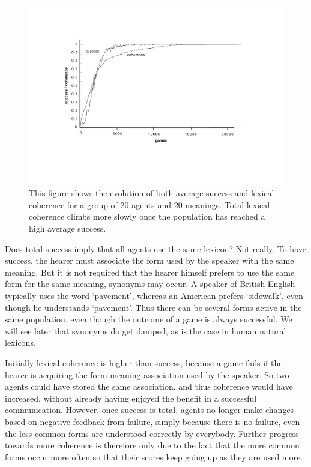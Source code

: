 \begin{figure}[htbp]
  \centerline{\includegraphics[width=\textwidth]{chap5/figs/suc-coh.pdf}}
\caption{\label{suc-coh}This figure shows the evolution of both average
success and lexical coherence for a group of 20 agents and 20 
meanings. Total lexical coherence climbs more slowly
once the 
population has reached a high average success.}
\end{figure}
Does total success imply that all agents use the 
same lexicon? Not really. To have success, the hearer
must associate the form used by the speaker
with the same meaning. But it is not required that the
hearer himself prefers to use the same form for the same meaning, 
synonyms may occur.  
A speaker of British English typically uses the word `pavement', 
whereas an American prefers `sidewalk', even though he
understands `pavement'. Thus there can 
be several forms active in the same population, even though 
the outcome of a game is always successful. We will see 
later that synonyms do get damped, as is the case in 
human natural lexicons. 

Initially lexical coherence is higher than success, because a game 
fails if the hearer is acquiring the form-meaning association
used by the speaker. So two agents could have stored the same association, 
and thus coherence would have increased, without already having enjoyed the benefit
in a successful communication. However, once success
is total, agents no longer make changes based on negative feedback
from failure, simply because there is no failure,  
even the less common forms are understood correctly 
by everybody. Further progress towards more coherence
is therefore only due to the 
fact that the more common forms occur more often so that
their scores keep going up as they are used more. 

